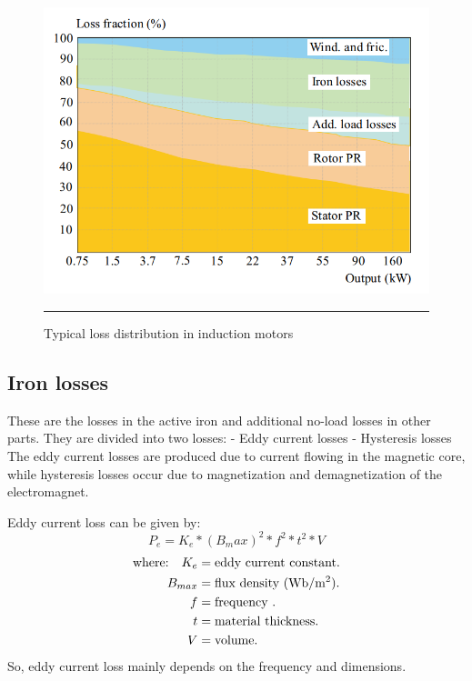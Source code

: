 \begin{figure}[htbp]
	\centering
		\includegraphics[width = 4.5in]{./Figures/MS/21.png}
		\rule{35em}{0.5pt}
	\caption{Typical loss distribution in induction motors}
	\label{fig:Typical loss distribution in induction motors}
\end{figure}

\subsection{Iron losses}
These are the losses in the active iron and additional no-load losses in other parts. They are divided into two losses:
-	Eddy current losses
-	Hysteresis losses
The eddy current losses are produced due to current flowing in the magnetic core, while hysteresis losses occur due to magnetization and demagnetization of the electromagnet.

Eddy current loss can be given by:
\begin{equation}
P_e=K_e * (B_max)^2 * f^2 * t^2 * V
\end{equation}
\begin{align*}
\text{where:}\quad
 K_e    &=  \text{eddy current constant.} \\
 B_{max}    &=  \text{flux density (Wb/m\textsuperscript{2}).} \\
 f    &=  \text{frequency .} \\
 t    &=  \text{material thickness.} \\
 V    &=  \text{volume.} \\
\end{align*}
So, eddy current loss mainly depends on the frequency and dimensions.


